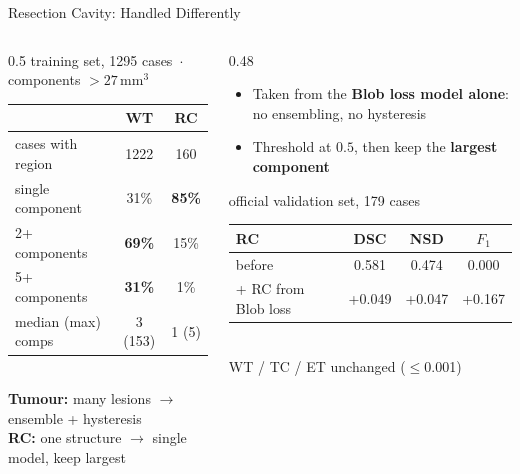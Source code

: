 \documentclass[aspectratio=169,11pt]{beamer}
\newcommand{\up}[1]{\textcolor{upgreen}{+#1}}
\begin{document}
\begin{frame}{Resection Cavity: Handled Differently}
\begin{columns}[c]
\begin{column}{0.5\textwidth}
\centering
{\scriptsize\color{black!60}training set, 1295 cases \,$\cdot$\, components $>27\,\mathrm{mm}^3$}\\[0.6em]
\footnotesize
\renewcommand{\arraystretch}{1.3}
\setlength{\tabcolsep}{6pt}
\begin{tabular}{@{}lcc@{}}
\toprule
 & WT & RC \\
\midrule
cases with region & 1222 & 160 \\
single component & 31\% & \textbf{85\%} \\
2+ components & \textbf{69\%} & 15\% \\
5+ components & \textbf{31\%} & 1\% \\
median (max) comps & 3 (153) & 1 (5) \\
\bottomrule
\end{tabular}\\[1em]
{\footnotesize\textbf{Tumour:} many lesions {\color{kclred}$\rightarrow$ ensemble + hysteresis}}\\[0.3em]
{\footnotesize\textbf{RC:} one structure {\color{kclred}$\rightarrow$ single model, keep largest}}
\end{column}
\begin{column}{0.48\textwidth}
\begin{itemize}\setlength\itemsep{0.6em}\footnotesize
  \item Taken from the \textbf{Blob loss model alone}: no ensembling, no hysteresis
  \item Threshold at $0.5$, then keep the \textbf{largest component}
\end{itemize}
\vspace{1em}
\centering
{\scriptsize\color{black!60}official validation set, 179 cases}\\[0.5em]
\footnotesize
\renewcommand{\arraystretch}{1.3}
\begin{tabular}{@{}lccc@{}}
\toprule
RC & DSC & NSD & $F_1$ \\
\midrule
before & 0.581 & 0.474 & 0.000 \\
+ RC from Blob loss & \up{0.049} & \up{0.047} & \up{0.167} \\
\bottomrule
\end{tabular}\\[0.5em]
{\scriptsize\color{black!60}WT / TC / ET unchanged ($\le$0.001)}
\end{column}
\end{columns}
\end{frame}
\end{document}
